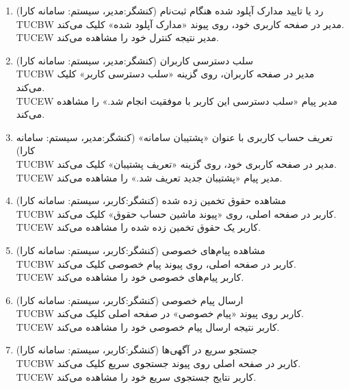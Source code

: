 \documentclass[12pt]{article}
\begin{document}
\begin{enumerate}
		\item
		رد یا تایید مدارک آپلود شده هنگام ثبت‌نام (کنشگر:‌مدیر، سیستم: سامانه کارا)\\
		TUCBW مدیر در صفحه کاربری خود، روی پیوند «مدارک آپلود شده» کلیک می‌کند.\\
		TUCEW مدیر نتیجه کنترل خود را مشاهده می‌کند.\\

		\item
		سلب دسترسی کاربران (کنشگر:‌مدیر، سیستم: سامانه کارا)\\
		TUCBW مدیر در صفحه کاربران، روی گزینه «سلب دسترسی کاربر» کلیک می‌کند.\\
		TUCEW مدیر پیام «سلب دسترسی این کاربر با موفقیت انجام شد.» را مشاهده می‌کند.\\

		\item
		تعریف حساب کاربری با عنوان «پشتیبان سامانه» (کنشگر:‌مدیر، سیستم: سامانه کارا)\\
		TUCBW مدیر در صفحه کاربری خود، روی گزینه «تعریف پشتیبان» کلیک می‌کند.\\
		TUCEW مدیر پیام «پشتیبان جدید تعریف شد.» را مشاهده می‌کند.\\

		\item
		مشاهده حقوق تخمین زده شده (کنشگر:‌کاربر، سیستم: سامانه کارا)\faStar\\
		TUCBW کاربر در صفحه اصلی، روی «پیوند ماشین حساب حقوق» کلیک می‌کند.\\
		TUCEW کاربر یک حقوق تخمین زده شده را مشاهده می‌کند.\\

		\item
	مشاهده پیام‌های خصوصی (کنشگر:‌کاربر، سیستم: سامانه کارا)\\
		TUCBW کاربر در صفحه اصلی، روی پیوند پیام خصوصی کلیک می‌کند.\\
		TUCEW کاربر پیام‌های خصوصی خود را مشاهده می‌کند.\\

		\item
		ارسال پیام خصوصی (کنشگر:‌کاربر، سیستم: سامانه کارا)\faStar\\
		TUCBW کاربر روی پیوند «پیام خصوصی» در صفحه اصلی کلیک می‌کند.\\
		TUCEW کاربر نتیجه ارسال پیام خصوصی خود را مشاهده می‌کند.\\

		\item
		جستجو سریع در آگهی‌ها (کنشگر:‌کاربر، سیستم: سامانه کارا)\\
		TUCBW کاربر در صفحه اصلی روی پیوند جستجوی سریع کلیک می‌کند.\\
		TUCEW کاربر نتایج جستجوی سریع خود را مشاهده می‌کند.\\


\end{enumerate}
\end{document}
